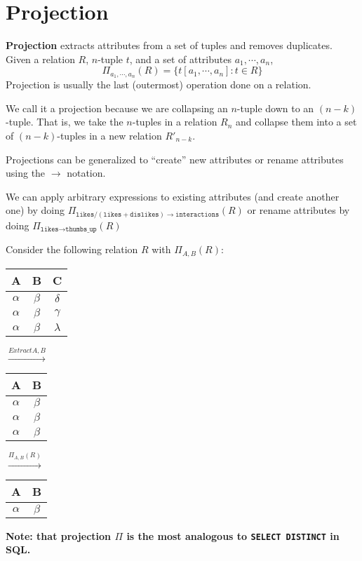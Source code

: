 \documentclass{report}
\newenvironment{definition}[1]{\begin{tcolorbox}[title={Definition: #1}]}{\end{tcolorbox}}
\newenvironment{example}{\begin{tcolorbox}[title={Example},colback=green!5!white,colframe=black!75!green]}{\end{tcolorbox}}
\newenvironment{aside}[1]{\begin{tcolorbox}[title={Aside: #1},colback=blue!5!white,colframe=black!75!blue]}{\end{tcolorbox}}
\renewcommand{\bf}[1]{\textbf{{#1}}}
\renewcommand{\tt}[1]{\texttt{{#1}}}
\renewcommand{\it}[1]{\textit{{#1}}}
\begin{document}
\section{Projection}
\begin{definition}{Projection}
    \bf{Projection} extracts attributes from a set of tuples and removes duplicates. Given a 
    relation $R$, $n$-tuple $t$, and a set of attributes $a_1, \cdots, a_n$,
    \[\Pi_{a_1, \cdots, a_n}(R) = \{ t[a_1, \cdots, a_n] : t \in R \}\]
    Projection is usually the last (outermost) operation done on a relation.
\end{definition}
\begin{aside}{Projection?}
    We call it a projection because we are collapsing an $n$-tuple down to an $(n - k)$-tuple. That
    is, we take the $n$-tuples in a relation $R_n$ and collapse them into a set of $(n-k)$-tuples 
    in a new relation $R'_{n - k}$. 
\end{aside}
Projections can be generalized to ``create'' new attributes or rename attributes using the $\to$
notation.
\begin{example}
    We can apply arbitrary expressions to existing attributes (and create another one) by doing
    $\Pi_{\tt{likes} / (\tt{likes} + \tt{dislikes}) \to \tt{interactions}}(R)$
    or rename attributes by doing
    $\Pi_{\tt{likes} \to \tt{thumbs\_up}}(R)$
\end{example}
\begin{example}
    Consider the following relation $R$ with $\Pi_{A, B}(R)$:
    \begin{center}
        \begin{tabular}{c|c|c}
            A & B & C \\
            \hline
            $\alpha$ & $\beta$ & $\delta$ \\
            $\alpha$ & $\beta$ & $\gamma$ \\
            $\alpha$ & $\beta$ & $\lambda$
        \end{tabular}
        $\overset{\it{Extract} A, B}{\longrightarrow}$
        \begin{tabular}{c|c}
            A & B \\
            \hline
            $\alpha$ & $\beta$ \\
            $\alpha$ & $\beta$ \\
            $\alpha$ & $\beta$
        \end{tabular}
        $\overset{\Pi_{A, B} (R)}{\longrightarrow}$
        \begin{tabular}{c|c}
            A & B \\
            \hline
            $\alpha$ & $\beta$
        \end{tabular}
    \end{center}
\end{example}
\begin{center}\bf{Note: that projection $\Pi$ is the most analogous to \tt{SELECT DISTINCT} in SQL.} \end{center}
\end{document}
